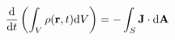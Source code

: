 \documentclass[preview]{standalone}
\begin{document}
\begin{align*}
\dv{}{t}\left( \int_{V} \rho(\mathbf{r},t) \dd V \right) = -\int_S \textbf{J}\cdot \text{d}\textbf{A}
\end{align*}
\end{document}
